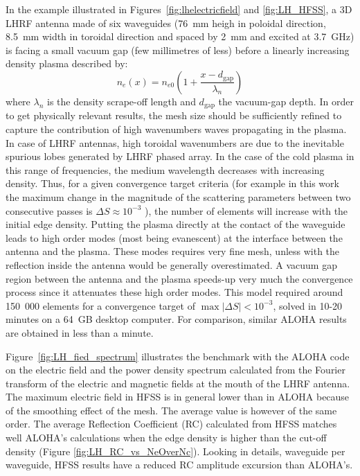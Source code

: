 In the example illustrated in Figures~\ref{fig:lhelectricfield} and \ref{fig:LH_HFSS}, a 3D LHRF antenna made of six waveguides (76~mm heigh in poloidal direction, 8.5~mm width in toroidal direction and spaced by 2~mm and excited at 3.7~GHz) is facing a small vacuum gap (few millimetres of less) before a linearly increasing density plasma described by:
\begin{equation}
	n_e(x)=n_{e0} \left(1+ \frac{x-d_\mathrm{gap}}{\lambda_n} \right)
\end{equation} 
where $\lambda_n$ is the density scrape-off length and $d_\mathrm{gap}$ the vacuum-gap depth. In order to get physically relevant results, the mesh size should be sufficiently refined to capture  the contribution of high wavenumbers waves propagating in the plasma. In case of LHRF antennas, high toroidal wavenumbers are due to the inevitable spurious lobes generated by LHRF phased array. In the case of the cold plasma in this range of frequencies, the medium wavelength decreases with increasing density. Thus, for a given convergence target criteria (for example in this work the maximum change in the magnitude of the scattering parameters between two consecutive passes is $\Delta S\approx 10^{-3}$ ), the number of elements will increase with the initial edge density. Putting the plasma directly at the contact of the waveguide leads to high order modes (most being evanescent) at the interface between the antenna and the plasma. These modes requires very fine mesh, unless with the reflection inside the antenna would be generally overestimated. A vacuum gap region between the antenna and the plasma speeds-up very much the convergence process since it attenuates these high order modes. This model required around 150~000 elements for a convergence target of $\max|\Delta S|<10^{-3}$, solved in 10-20 minutes on a 64~GB desktop computer. For comparison, similar ALOHA results are obtained in less than a minute. 

Figure~\ref{fig:LH_fied_spectrum} illustrates the benchmark with the ALOHA code on the electric field and the power density spectrum calculated from the Fourier transform of the electric and magnetic fields at the mouth of the LHRF antenna. The maximum electric field in HFSS is in general lower than in ALOHA because of the smoothing effect of the mesh. The average value is however of the same order. The average Reflection Coefficient (RC) calculated from HFSS matches well ALOHA's calculations when the edge density is higher than the cut-off density (Figure \ref{fig:LH_RC_vs_NeOverNc}). Looking in details, waveguide per waveguide, HFSS results have a reduced RC amplitude  excursion than ALOHA's.  

